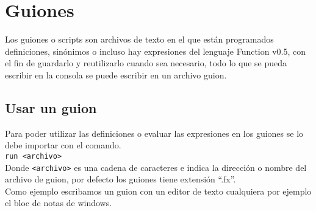 
\titlespacing{\subsection}{0pt}{10pt}{0pt}

\chapter{Guiones}
   Los guiones o scripts son archivos de texto en el que están programados definiciones, sinónimos o incluso hay expresiones del lenguaje Function v0.5, con el fin de guardarlo y reutilizarlo cuando sea necesario, todo lo que se pueda escribir en la consola se puede escribir en un archivo guion.
   
   \section{Usar un guion}
       Para poder utilizar las definiciones o evaluar las expresiones en los guiones se lo debe importar con el comando.
      \\
      
      \texttt{run~<archivo>}   
      \\
      
      Donde \texttt{<archivo>} es una cadena de caracteres e indica la dirección o nombre del archivo de guion, por defecto los guiones tiene extensión ``.fx''.
      \\
      
      Como ejemplo escribamos un guion con un editor de texto cualquiera por ejemplo el bloc de notas de windows.
      
      \begin{fxcode}
         \\
         \\
         \\
         \linecode{                                             }\\
         \\
         \linecode{[] + [] := []                                }\\
         \\
         \linecode{                                             }\\
         \\
         \linecode{[] - [] := []                                }\\
      \end{fxcode}
      
